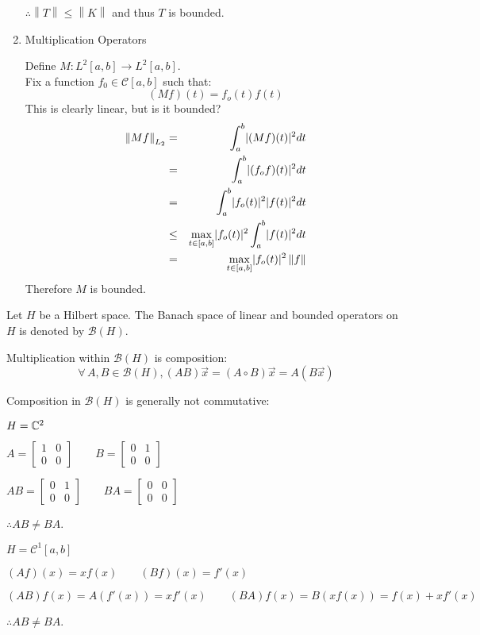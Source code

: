 \documentclass[letterpaper,12pt,fleqn]{article}
\newcommand{\vx}{\vec{x}}
\newcommand{\norm}[1]{\left\|#1\right\|}
\newcommand{\mb}{\mathcal{B}}
\newcommand{\mc}{\mathcal{C}}
\begin{document}
\begin{examples}
\begin{enumerate}
    $\therefore\norm{T}\le\norm{K}$ and thus $T$ is bounded.

  \item Multiplication Operators

    Define $M:L^2[a,b]\to L^2[a,b]$. \\
    Fix a function $f_0\in\mc[a,b]$ such that:
    \[(Mf)(t)=f_o(t)f(t)\]
    This is clearly linear, but is it bounded?
    \begin{eqnarray*}
      \norm{Mf}_{L_2} &=& \int_a^b\abs{(Mf)(t)}^2dt \\
      &=& \int_a^b\abs{(f_of)(t)}^2dt \\
      &=& \int_a^b\abs{f_o(t)}^2\abs{f(t)}^2dt \\
      &\le& \max_{t\in[a,b]}\abs{f_o(t)}^2\int_a^b\abs{f(t)}^2dt \\
      &=& \max_{t\in[a,b]}\abs{f_o(t)}^2\norm{f}
    \end{eqnarray*}
    Therefore $M$ is bounded.
  \end{enumerate}
\end{examples}

\begin{notation}
  Let $H$ be a Hilbert space. The Banach space of linear and bounded operators
  on $H$ is denoted by $\mb(H)$.
\end{notation}

Multiplication within $\mb(H)$ is composition:
\[\forall\,A,B\in\mb(H),(AB)\vx=(A\circ B)\vx=A(B\vx)\]

Composition in $\mb(H)$ is generally not commutative:
\begin{examples}
\item $H=\mathbb{C}^2$

  $A=\begin{bmatrix} 1 & 0 \\ 0 & 0 \end{bmatrix}\qquad
  B=\begin{bmatrix} 0 & 1 \\ 0 & 0 \end{bmatrix}$

  $AB=\begin{bmatrix} 0 & 1 \\ 0 & 0 \end{bmatrix}\qquad
  BA=\begin{bmatrix} 0 & 0 \\ 0 & 0 \end{bmatrix}$

  $\therefore AB\ne BA$.

\item $H=\mc^1[a,b]$

  $(Af)(x)=x f(x)\qquad(Bf)(x)=f'(x)$

  $(AB)f(x)=A(f'(x))=xf'(x)\qquad(BA)f(x)=B(xf(x))=f(x)+xf'(x)$

  $\therefore AB\ne BA$.
\end{examples}
\end{document}
